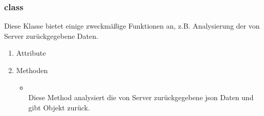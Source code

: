 \documentclass[a4paper]{scrreprt}
\begin{document}
                \subsubsection{class }

                    Diese Klasse bietet einige zweckmäßige Funktionen an, z.B. Analysierung der  von Server zurückgegebene Daten.

                    \begin{enumerate}
                        \item Attribute
                        \item Methoden
                            \begin{itemize}
                                \item {}\\
                                Diese Method analysiert die von Server zurückgegebene json Daten und gibt  Objekt zurück.
                            \end{itemize}
                    \end{enumerate}


    \glsaddall
    \printglossary

    \listoffigures
\end{document}
